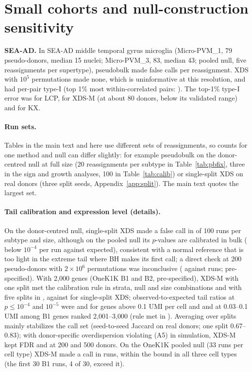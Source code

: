 \section{Small cohorts and null-construction sensitivity}\label{app:smallD}

\textbf{SEA-AD.} In SEA-AD middle temporal gyrus microglia \citep{Gabitto2024SEAAD} (Micro-PVM\_1, 79 pseudo-donors, median 15 nuclei; Micro-PVM\_3, 83, median 43; pooled null, five reassignments per supertype), pseudobulk made \SeaPBcalls{} false calls per reassignment. XDS with $10^5$ permutations made none, which is uninformative at this resolution, and had per-pair type-I \SeaXDSTI{} (top 1\% most within-correlated pairs: \SeaXDSTop). The top-1\% type-I error was \SeaLCPTop{} for LCP, \SeaXDSMTop{} for XDS-M (at about 80 donors, below its validated range) and \SeaKXTop{} for KX.

\paragraph{Run sets.} Tables in the main text and here use different sets of reassignments, so counts for one method and null can differ slightly: for example pseudobulk on the donor-centred null at full size (20 reassignments per subtype in Table~\ref{tab:pbfix}, three in the sign and growth analyses, 100 in Table~\ref{tab:calib}) or single-split XDS on real donors (three split seeds, Appendix~\ref{app:split}). The main text quotes the largest set.

\paragraph{Tail calibration and expression level (details).} On the donor-centred null, single-split XDS made a false call in \RtwoRangeXDS{} of 100 runs per subtype and size, although on the pooled null its $p$-values are calibrated in bulk (\RoneXDSnfour{} below $10^{-4}$ per run against \RoneExpnfour{} expected), consistent with a normal reference that is too light in the extreme tail where BH makes its first call; a direct check at 200 pseudo-donors with $2\times10^6$ permutations was inconclusive (\PermTwoXperm{} against \PermTwoXnorm{} runs; pre-specified). With 2{,}000 genes (OneK1K B1 and B2, pre-specified), XDS-M with one split met the calibration rule in \AtwoHiDecMone{} strata, null and size combinations and with five splits in \AtwoHiDecM, against \AtwoHiDecS{} for single-split XDS; observed-to-expected tail ratios at $p\le10^{-4}$ and $10^{-5}$ were \AtwoHiFourM{} and \AtwoHiFiveM{} for genes above 0.1 UMI per cell and \AtwoLoFourM{} and \AtwoLoFiveM{} at 0.03--0.1 UMI among B1 genes ranked 2{,}001--3{,}000 (rule met in \AtwoLoDecM). Averaging over splits mainly stabilizes the call set (seed-to-seed Jaccard \RealXDSMjac{} on real donors; one split 0.67--0.83); with donor-specific overdispersion violating (A5) in simulation, XDS-M kept FDR \FtwoFDRXDSM{} and \FfiveFDRXDSM{} at 200 and 500 donors. On the OneK1K pooled null (33 runs per cell type) XDS-M made a call in \OnekEanyXDSM{} runs, within the bound in all three cell types (the first 30 B1 runs, 4 of 30, exceed it).

